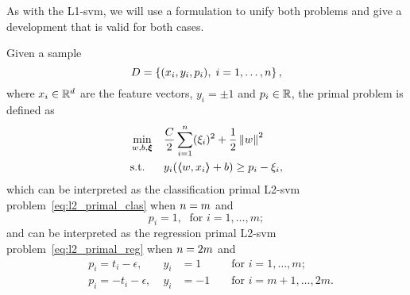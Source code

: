 As with the L1-\acrshort{svm}, we will use a formulation to unify both problems and give a development that is valid for both cases. 
%
%
\begin{definition}
    Given a sample
    $$ D = \left\{(x_i, y_i, p_i), \; i=1, \ldots, n\right\} ,$$
    where $x_i \in \mathbb{R}^d$ are the feature vectors, $y_i = \pm 1$ and $p_i \in \mathbb{R}$, 
    the primal problem is defined as
    \begin{equation}
        \label{eq:l2_primal}
        \begin{aligned}
            &\min_{w, b, \fv{\xi}} & & \frac{C}{2} \sum_{i=1}^\nsamples (\xi_i)^2 + \frac{1}{2} \norm{w}^2 \\
            & \text{s.t.} & & y_i (\dotp{w}{x_i} + b) \geq p_i - \xi_i ,     
        \end{aligned}  
    \end{equation}
    which can be interpreted as the classification primal L2-\acrshort{svm} problem~\eqref{eq:l2_primal_clas} when $n=m$ and
    $$ p_i = 1,\; \text{ for } i=1, \ldots, m ;$$
    and can be interpreted as the regression primal L2-\acrshort{svm} problem~\eqref{eq:l2_primal_reg} when $n = 2 m$ and
    \begin{equation}
        \nonumber
        \begin{aligned}
            & p_i = t_i - \epsilon ,\; &y_i &= 1 &&\text{ for } i=1, \ldots, m ; \\
            & p_i = -t_i - \epsilon ,\; &y_i &= -1 &&\text{ for } i=m+1, \ldots, 2m .
        \end{aligned}
    \end{equation}
\end{definition}
%
